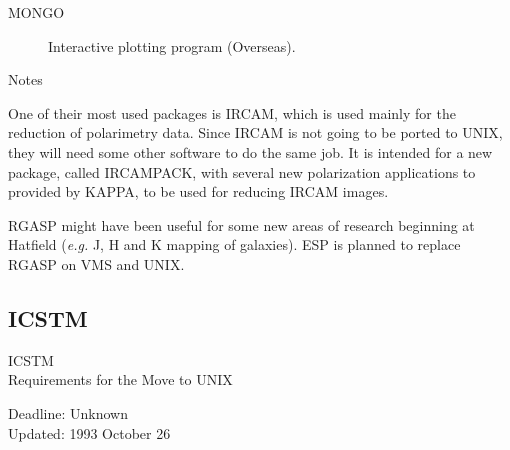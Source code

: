 \begin{description}
\item[MONGO] Interactive plotting program (Overseas).
\end{description}


\vspace{5mm}
\begin{center}
{\large\sc Notes}
\end{center}

One of their most used packages is IRCAM, which is used mainly for the
reduction of polarimetry data.
Since IRCAM is not going to be ported to UNIX, they will need some other
software to do the same job.
It is intended for a new package, called IRCAMPACK, with several new
polarization applications to provided by KAPPA, to be used for reducing
IRCAM images.

RGASP might have been useful for some new areas of research beginning at
Hatfield ({\em e.g.} J, H and K mapping of galaxies).
ESP is planned to replace RGASP on VMS and UNIX.


\newpage
\subsection{ICSTM}

\renewcommand{\starsitename}{ICSTM}
\renewcommand{\starnodename}{ICVAD}

\renewcommand{\starunixdate}{Unknown}
\renewcommand{\starupdate}{1993 October 26}

\renewcommand{\starsitetelephone}{071 589 5111 Ext. 6658}
\renewcommand{\starsitefax}{071 589 9463}

\begin{center}
{\Large\sc \starsitename \\ [2ex]
           Requirements for the Move to UNIX}

\vspace{3mm}
{\large\sc Deadline: \starunixdate \\ [1ex]
           Updated: \starupdate}
\end{center}

\vspace{5mm}

